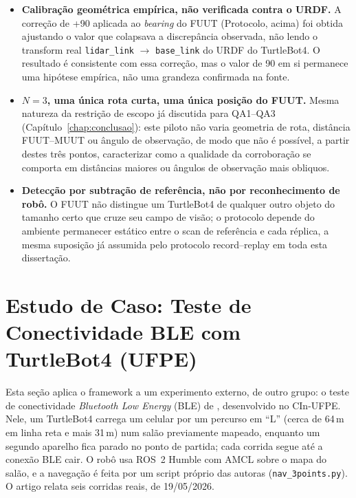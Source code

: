 \begin{itemize}
    \item \textbf{Calibração geométrica empírica, não verificada contra o
    URDF.} A correção de +90\textdegree{} aplicada ao \textit{bearing} do FUUT
    (Protocolo, acima) foi obtida ajustando o valor que colapsava a
    discrepância observada, não lendo o transform real
    \texttt{lidar\_\allowbreak link} $\rightarrow$ \texttt{base\_\allowbreak link}
    do URDF do TurtleBot4. O resultado é consistente com essa correção,
    mas o valor de 90\textdegree{} em si permanece uma hipótese empírica, não uma
    grandeza confirmada na fonte.

    \item \textbf{$N=3$, uma única rota curta, uma única posição do
    FUUT.} Mesma natureza da restrição de escopo já discutida para QA1--QA3
    (Capítulo~\ref{chap:conclusao}): este piloto não varia geometria de
    rota, distância FUUT--MUUT ou ângulo de observação, de modo que não é
    possível, a partir destes três pontos, caracterizar como a qualidade
    da corroboração se comporta em distâncias maiores ou ângulos de
    observação mais obliquos.

    \item \textbf{Detecção por subtração de referência, não por
    reconhecimento de robô.} O FUUT não distingue um TurtleBot4 de
    qualquer outro objeto do tamanho certo que cruze seu campo de visão;
    o protocolo depende do ambiente permanecer estático entre o scan de
    referência e cada réplica, a mesma suposição já assumida pelo
    protocolo record--replay em toda esta dissertação.

\end{itemize}

\section{Estudo de Caso: Teste de Conectividade BLE com TurtleBot4 (UFPE)}
\label{sec:res_cbsoft}

Esta seção aplica o framework a um experimento externo, de outro grupo:
o teste de conectividade \textit{Bluetooth Low Energy} (BLE) de
, desenvolvido no CIn-UFPE. Nele, um TurtleBot4
carrega um celular por um percurso em ``L'' (cerca de 64\,m em linha reta
e mais 31\,m) num salão previamente mapeado, enquanto um segundo aparelho
fica parado no ponto de partida; cada corrida segue até a conexão BLE cair.
O robô usa ROS~2 Humble \cite{macenski2022ros2} com AMCL sobre o mapa do salão, e a navegação é
feita por um script próprio das autoras (\texttt{nav\_\allowbreak 3points.py}).
O artigo relata seis corridas reais, de 19/05/2026.

